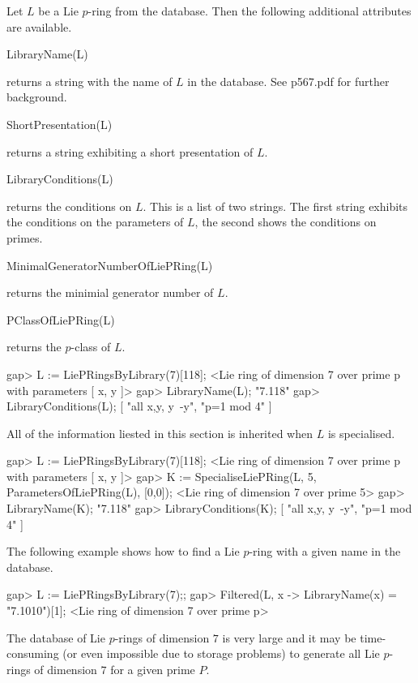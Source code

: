 
Let $L$ be a Lie $p$-ring from the database. Then the following additional
attributes are available. 

\> LibraryName(L)

returns a string with the name of $L$ in the database. See p567.pdf for
further background.

\> ShortPresentation(L)

returns a string exhibiting a short presentation of $L$.

\> LibraryConditions(L)

returns the conditions on $L$. This is a list of two strings. The first
string exhibits the conditions on the parameters of $L$, the second shows
the conditions on primes.

\> MinimalGeneratorNumberOfLiePRing(L)

returns the minimial generator number of $L$.

\> PClassOfLiePRing(L)

returns the $p$-class of $L$.

\beginexample
gap> L := LiePRingsByLibrary(7)[118];
<Lie ring of dimension 7 over prime p with parameters [ x, y ]>
gap> LibraryName(L);
"7.118"
gap> LibraryConditions(L);
[ "all x,y, y~-y", "p=1 mod 4" ]
\endexample

All of the information liested in this section is inherited when $L$
is specialised.

\beginexample
gap> L := LiePRingsByLibrary(7)[118];
<Lie ring of dimension 7 over prime p with parameters [ x, y ]>
gap> K := SpecialiseLiePRing(L, 5, ParametersOfLiePRing(L), [0,0]);
<Lie ring of dimension 7 over prime 5>
gap> LibraryName(K);
"7.118"
gap> LibraryConditions(K);
[ "all x,y, y~-y", "p=1 mod 4" ]
\endexample

The following example shows how to find a Lie $p$-ring with a 
given name in the database.

\beginexample
gap> L := LiePRingsByLibrary(7);;
gap> Filtered(L, x -> LibraryName(x) = "7.1010")[1];
<Lie ring of dimension 7 over prime p> 
\endexample


The database of Lie $p$-rings of dimension $7$ is very large and it may
be time-consuming (or even impossible due to storage problems) to generate
all Lie $p$-rings of dimension $7$ for a given prime $P$. 

